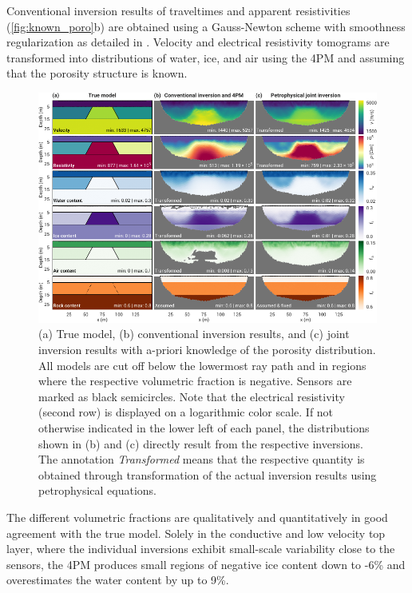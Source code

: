 \documentclass[extra]{gji}
\begin{document}
Conventional inversion results of traveltimes and apparent resistivities (\autoref{fig:known_poro}b) are obtained using a Gauss-Newton scheme with smoothness regularization as detailed in \cite{Ruecker2017}.
Velocity and electrical resistivity tomograms are transformed into distributions of water, ice, and air using the 4PM and assuming that the porosity structure is known.

\begin{figure}
 \centering
 \includegraphics[width=\textwidth]{./Fig2_two_columns}
 \caption{(a) True model, (b) conventional inversion results, and (c) joint inversion results with a-priori knowledge of the porosity distribution. All models are cut off below the lowermost ray path and in regions where the respective volumetric fraction is negative. Sensors are marked as black semicircles. Note that the electrical resistivity (second row) is displayed on a logarithmic color scale. If not otherwise indicated in the lower left of each panel, the distributions shown in (b) and (c) directly result from the respective inversions. The annotation \textit{Transformed} means that the respective quantity is obtained through transformation of the actual inversion results using petrophysical equations.}
 \label{fig:known_poro}
\end{figure}

The different volumetric fractions are qualitatively and quantitatively in good agreement with the true model.
Solely in the conductive and low velocity top layer, where the individual inversions exhibit small-scale variability close to the sensors, the 4PM produces small regions of negative ice content down to -6\% and overestimates the water content by up to 9\%.
\end{document}

